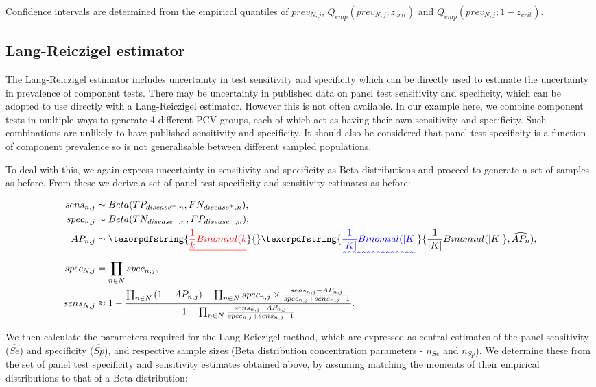 \documentclass[a4paper, 12pt, twoside]{article}
\let\Oldsubsection\subsection
\renewcommand{\subsection}{\FloatBarrier\Oldsubsection}
\providecommand{\DIFaddtex}[1]{{\protect\color{blue}\uwave{#1}}} %
\providecommand{\DIFdeltex}[1]{{\protect\color{red}\sout{#1}}}                      %
\providecommand{\DIFaddbegin}{} %
\providecommand{\DIFaddend}{} %
\providecommand{\DIFdelbegin}{} %
\providecommand{\DIFdelend}{} %
\providecommand{\DIFadd}[1]{\texorpdfstring{\DIFaddtex{#1}}{#1}} %
\providecommand{\DIFdel}[1]{\texorpdfstring{\DIFdeltex{#1}}{}} %
\begin{document}
Confidence intervals are determined from the empirical quantiles of \(prev_{N,j}\), \(Q_{emp}(prev_{N,j};z_{crit})\) and \(Q_{emp}(prev_{N,j};1-z_{crit})\).

\subsection{Lang-Reiczigel estimator}

The Lang-Reiczigel estimator\cite{lang2014} includes uncertainty in test sensitivity and specificity which can be directly used to estimate the uncertainty in prevalence of component tests. There may be uncertainty in published data on panel test sensitivity and specificity, which can be adopted to use directly with a Lang-Reiczigel estimator. However this is not often available. In our example here, we combine component tests in multiple ways to generate 4 different PCV groups, each of which act as having their own sensitivity and specificity. Such combinations are unlikely to have published sensitivity and specificity. It should also be considered that panel test specificity is a function of component prevalence so is not generalisable between different sampled populations.

To deal with this, we again express uncertainty in sensitivity and specificity as Beta distributions and proceed to generate a set of samples as before. From these we derive a set of panel test specificity and sensitivity estimates as before:

\begin{equation*}
\begin{aligned}
sens_{n,j} &\sim Beta(TP_{disease^+,n}, FN_{disease^+,n}), \\
spec_{n,j} &\sim Beta(TN_{disease^-,n}, FP_{disease^-,n}), \\
AP_{n,j} &\sim \DIFdelbegin \DIFdel{\frac{1}{k}Binomial(k}\DIFdelend \DIFaddbegin \DIFadd{\frac{1}{|K|}Binomial(|K|}\DIFaddend , \widehat{AP_n}), \\
spec_{N,j} &= \prod_{n \in N}{spec_{n,j}}, \\
sens_{N,j} &\approx 1-\frac{
  \prod_{n \in N}{(1-AP_{n,j})} - \prod_{n \in N}{spec_{n,j} \times \frac{sens_{n,j}-AP_{n,j}}{spec_{n,j} + sens_{n,j} - 1}}
}{
  1 - \prod_{n \in N}{ \frac{sens_{n,j}-AP_{n,j}}{spec_{n,j} + sens_{n,j} - 1} }
}. \\
\end{aligned}
\end{equation*}

We then calculate the parameters required for the Lang-Reiczigel method\cite{lang2014}, which are expressed as central estimates of the panel sensitivity (\(\widehat{Se}\)) and specificity (\(\widehat{Sp}\)), and respective sample sizes (Beta distribution concentration parameters - \(n_{Se}\) and \(n_{Sp}\)). We determine these from the set of panel test specificity and sensitivity estimates obtained above, by assuming matching the moments of their empirical distributions to that of a Beta distribution:
\end{document}
